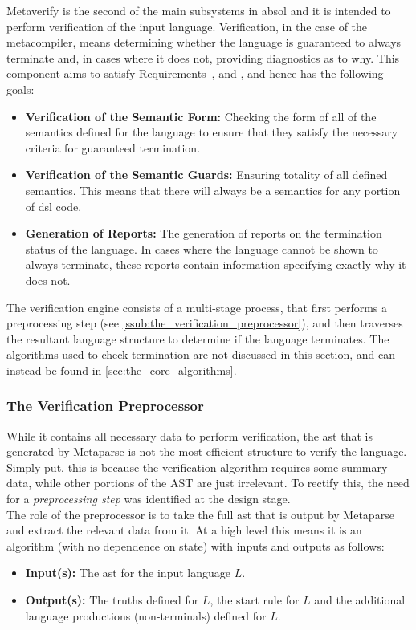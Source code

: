 Metaverify is the second of the main subsystems in \gls{absol} and it is intended to perform verification of the input language. 
Verification, in the case of the metacompiler, means determining whether the language is guaranteed to always terminate and, in cases where it does not, providing diagnostics as to why.
This component aims to satisfy Requirements~,  and , and hence has the following goals:
\begin{itemize}
    \item \textbf{Verification of the Semantic Form:} Checking the form of all of the semantics defined for the language to ensure that they satisfy the necessary criteria for guaranteed termination. 
    \item \textbf{Verification of the Semantic Guards:} Ensuring totality of all defined semantics.
    This means that there will always be a semantics for any portion of \gls{dsl} code. 
    \item \textbf{Generation of Reports:} The generation of reports on the termination status of the language. 
    In cases where the language cannot be shown to always terminate, these reports contain information specifying exactly why it does not. 
\end{itemize}

The verification engine consists of a multi-stage process, that first performs a preprocessing step (see \autoref{ssub:the_verification_preprocessor}), and then traverses the resultant language structure to determine if the language terminates. 
The algorithms used to check termination are not discussed in this section, and can instead be found in \autoref{sec:the_core_algorithms}.

\subsubsection{The Verification Preprocessor} %
\label{ssub:the_verification_preprocessor}
While it contains all necessary data to perform verification, the \gls{ast} that is generated by Metaparse is not the most efficient structure to verify the language. 
Simply put, this is because the verification algorithm requires some summary data, while other portions of the AST are just irrelevant.
To rectify this, the need for a \textit{preprocessing step} was identified at the design stage. \\

The role of the preprocessor is to take the full \gls{ast} that is output by Metaparse and extract the relevant data from it. 
At a high level this means it is an algorithm (with no dependence on state) with inputs and outputs as follows:
\begin{itemize}
    \item \textbf{Input(s):} The \gls{ast} for the input language $L$.
    \item \textbf{Output(s):} The truths defined for $L$, the start rule for $L$ and the additional language productions (non-terminals) defined for $L$. 
\end{itemize}

